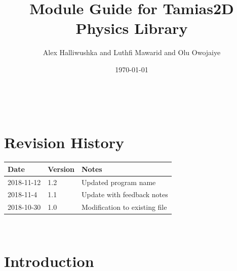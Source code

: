 \documentclass[12pt]{article}
\begin{document}
\title{Module Guide for Tamias2D Physics Library} 
\author{Alex Halliwushka and Luthfi Mawarid and Olu Owojaiye}
\date{\today}
	
\maketitle

~\newpage


\section{Revision History}

\begin{tabularx}{\textwidth}{p{3cm}p{2cm}X}
\toprule {\bf Date} & {\bf Version} & {\bf Notes}\\
\midrule
2018-11-12 & 1.2 & Updated program name\\
2018-11-4 & 1.1 & Update with feedback notes\\
2018-10-30 & 1.0 & Modification to existing file\\
\bottomrule
\end{tabularx}

~\newpage

\tableofcontents

\listoftables

\listoffigures

\newpage



\section{Introduction}
\end{document}
